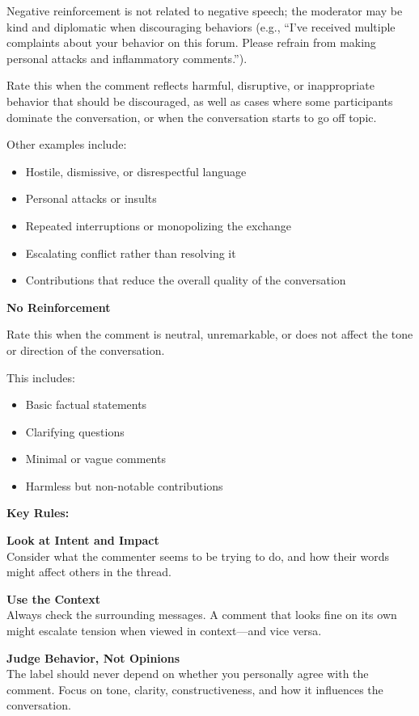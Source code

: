 \documentclass[11pt]{article}
\theoremstyle{definition}
\theoremstyle{plain}
\begin{document}
Negative reinforcement is not related to negative speech; the moderator may be kind and diplomatic when discouraging behaviors (e.g., ``I've received multiple complaints about your behavior on this forum. Please refrain from making personal attacks and inflammatory comments.'').

Rate this when the comment reflects harmful, disruptive, or inappropriate behavior that should be discouraged, as well as cases where some participants dominate the conversation, or when the conversation starts to go off topic.

Other examples include:
\begin{itemize}
	\item Hostile, dismissive, or disrespectful language
	\item Personal attacks or insults
	\item Repeated interruptions or monopolizing the exchange
	\item Escalating conflict rather than resolving it
	\item Contributions that reduce the overall quality of the conversation
\end{itemize}

\textbf{No Reinforcement}

Rate this when the comment is neutral, unremarkable, or does not affect the tone or direction of the conversation.

This includes:
\begin{itemize}
	\item Basic factual statements
	\item Clarifying questions
	\item Minimal or vague comments
	\item Harmless but non-notable contributions
\end{itemize}

\textbf{Key Rules:}

\textbf{Look at Intent and Impact} \\
Consider what the commenter seems to be trying to do, and how their words might affect others in the thread.

\textbf{Use the Context} \\
Always check the surrounding messages. A comment that looks fine on its own might escalate tension when viewed in context—and vice versa.

\textbf{Judge Behavior, Not Opinions} \\
The label should never depend on whether you personally agree with the comment. Focus on tone, clarity, constructiveness, and how it influences the conversation.
\end{document}
